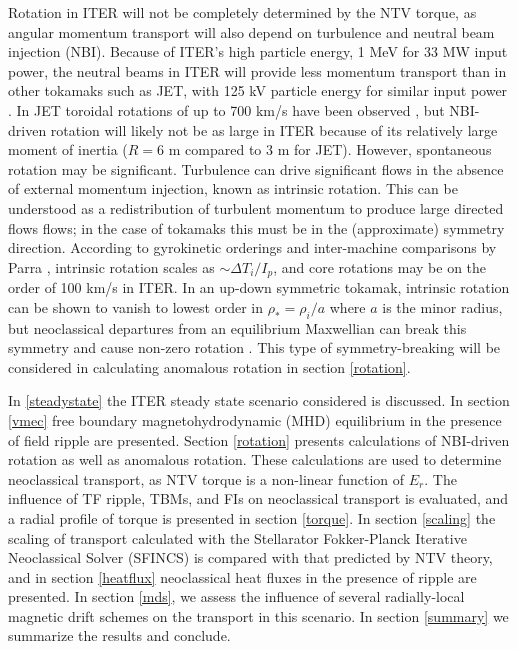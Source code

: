 \documentclass{article}
\begin{document}
Rotation in ITER will not be completely determined by the NTV torque, as angular momentum transport will also depend on turbulence and neutral beam injection (NBI). Because of ITER's high particle energy, 1 MeV for 33 MW input power, the neutral beams in ITER will provide less momentum transport than in other tokamaks such as JET, with 125 kV particle energy for similar input power \cite{Ciric2011}. In JET toroidal rotations of up to 700 km/s have been observed \cite{DeVries2008}, but NBI-driven rotation will likely not be as large in ITER because of its relatively large moment of inertia ($R = 6$ m compared to 3 m for JET). However, spontaneous rotation may be significant. Turbulence can drive significant flows in the absence of external momentum injection, known as intrinsic rotation. This can be understood as a redistribution of turbulent momentum to produce large directed flows flows; in the case of tokamaks this must be in the (approximate) symmetry direction. According to gyrokinetic orderings and inter-machine comparisons by Parra \cite{Parra2012}, intrinsic rotation scales as $\sim \Delta T_i/I_p$, and core rotations may be on the order of 100 km/s in ITER.  In an up-down symmetric tokamak, intrinsic rotation can be shown to vanish to lowest order in $\rho_* = \rho_i/a$ where $a$ is the minor radius, but neoclassical departures from an equilibrium Maxwellian can break this symmetry and cause non-zero rotation \cite{Barnes2013}. This type of symmetry-breaking will be considered in calculating anomalous rotation in section \ref{rotation}. 

In \ref{steadystate} the ITER steady state scenario considered is discussed. In section \ref{vmec} free boundary magnetohydrodynamic (MHD) equilibrium in the presence of field ripple are presented. Section \ref{rotation} presents calculations of NBI-driven rotation as well as anomalous rotation. These calculations are used to determine neoclassical transport, as NTV torque is a non-linear function of $E_r$. The influence of TF ripple, TBMs, and FIs on neoclassical transport is evaluated, and a radial profile of torque is presented in section \ref{torque}. In section \ref{scaling} the scaling of transport calculated with the Stellarator Fokker-Planck Iterative Neoclassical Solver (SFINCS) is compared with that predicted by NTV theory, and in section \ref{heatflux} neoclassical heat fluxes in the presence of ripple are presented. In section \ref{mds}, we assess the influence of several radially-local magnetic drift schemes on the transport in this scenario. In section \ref{summary} we summarize the results and conclude.
\end{document}
